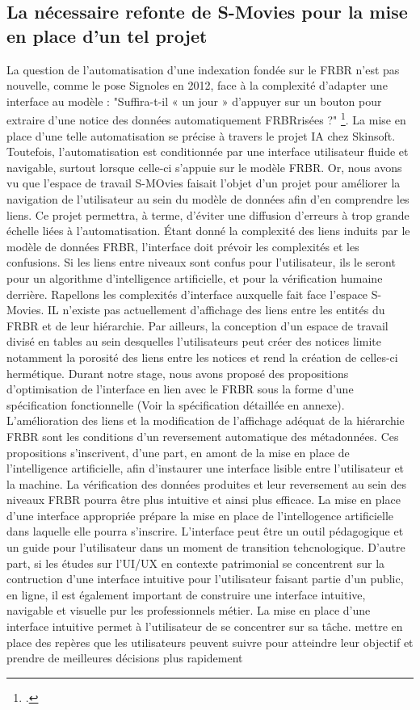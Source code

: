
\subsection{La nécessaire refonte de S-Movies pour la mise en place d'un tel projet} 
La question de l'automatisation d'une indexation fondée sur le FRBR n'est pas nouvelle, comme le pose Signoles en 2012, face à la complexité d'adapter une interface au modèle : "Suffira-t-il « un jour » d’appuyer sur un bouton pour extraire d’une notice des données automatiquement FRBRrisées ?" \footcite{signoles}. La mise en place d'une telle automatisation se précise à travers le projet IA chez Skinsoft. Toutefois, l'automatisation est conditionnée par une interface utilisateur fluide et navigable, surtout lorsque celle-ci s'appuie sur le modèle FRBR. Or, nous avons vu que l'espace de travail S-MOvies faisait l'objet d'un projet pour améliorer la navigation de l'utilisateur au sein du modèle de données afin d'en comprendre les liens. Ce projet permettra, à terme, d'éviter une diffusion d'erreurs à trop grande échelle liées à l'automatisation. Étant donné la complexité des liens induits par le modèle de données FRBR, l'interface doit prévoir les complexités et les confusions. Si les liens entre niveaux sont confus pour l'utilisateur, ils le seront pour un algorithme d'intelligence artificielle, et pour la vérification humaine derrière. 
Rapellons les complexités d'interface auxquelle fait face l'espace S-Movies. IL n'existe pas actuellement d'affichage des liens entre les entités du FRBR et de leur hiérarchie. Par ailleurs, la conception d'un espace de travail divisé en tables au sein desquelles l'utilisateurs peut créer des notices limite notamment la porosité des liens entre les notices et rend la création de celles-ci hermétique. 
Durant notre stage, nous avons proposé des propositions d'optimisation de l'interface en lien avec le FRBR sous la forme d'une spécification fonctionnelle (Voir la spécification détaillée en annexe). 
L'amélioration des liens et la modification de l'affichage adéquat de la hiérarchie FRBR sont les conditions d'un reversement automatique des métadonnées.
Ces propositions s'inscrivent, d'une part, en amont de la mise en place de l'intelligence artificielle, afin d'instaurer une interface lisible entre l'utilisateur et la machine. La vérification des données produites et leur reversement au sein des niveaux FRBR pourra être plus intuitive et ainsi plus efficace. La mise en place d'une interface appropriée prépare la mise en place de l'intellogence artificielle dans laquelle elle pourra s'inscrire. L'interface peut être un outil pédagogique et un guide pour l'utilisateur dans un moment de transition tehcnologique. D'autre part, si les études sur l'UI/UX en contexte patrimonial se concentrent sur la contruction d'une interface intuitive pour l'utilisateur faisant partie d'un public, en ligne, il est également important de construire une interface intuitive, navigable et visuelle pur les professionnels métier. La mise en place d'une interface intuitive permet à l'utilisateur de se concentrer sur sa tâche. mettre en place des repères que les utilisateurs peuvent suivre pour atteindre leur objectif et prendre de meilleures décisions plus rapidement 

